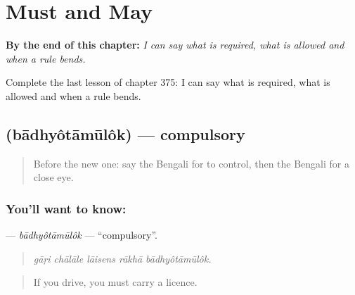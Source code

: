 
\chapter{Must and May}
\label{ch:bn-must-and-may}

\begin{chapteropening}
\textbf{By the end of this chapter:} \emph{I can say what is required, what is allowed and when a rule bends.}

Complete the last lesson of chapter 375: I can say what is required, what is allowed and when a rule bends.
\end{chapteropening}

\section[\texorpdfstring{\bn{বাধ্যতামূলক} (bādhyôtāmūlôk)}{বাধ্যতামূলক (bādhyôtāmūlôk)}]{ (bādhyôtāmūlôk) — compulsory}

\label{lesson:BN-C375-badhyotamulok}



\begin{quote}
Before the new one: say the Bengali for to control, then the Bengali for a close eye.
\end{quote}

\subsection*{You'll want to know: }
\textbf{} — \emph{bādhyôtāmūlôk} — \textquotedblleft{}compulsory\textquotedblright{}.

\begin{quote}
    
\end{quote}

\begin{quote}
\emph{gāṛi chālāle lāisens rākhā bādhyôtāmūlôk.}
\end{quote}

\begin{quote}
If you drive, you must carry a licence.
\end{quote}


